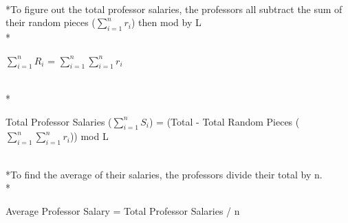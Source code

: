 \documentclass{article}
\begin{document}
\smallskip
\\*To figure out the total professor salaries, the professors all subtract the sum of their random pieces ($\sum_{i=1}^{n} r_{i}$) then mod by L
\\*\centerline{$\sum_{i=1}^{n} R_{i}$ = $\sum_{i=1}^{n}\sum_{i=1}^{n} r_{i}$}
\smallskip
\\*\centerline{Total Professor Salaries ($\sum_{i=1}^{n} S_{i}$) = (Total - Total Random Pieces ($\sum_{i=1}^{n}\sum_{i=1}^{n} r_{i}$)) mod L}
\smallskip
\\*To find the average of their salaries, the professors divide their total by n.
\smallskip
\\*\centerline{Average Professor Salary = Total Professor Salaries / n}
\end{document}
